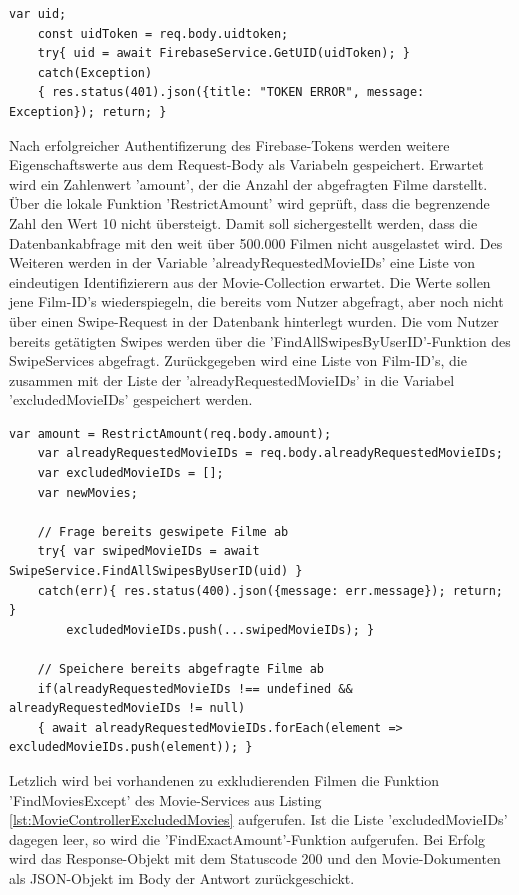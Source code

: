 \begin{lstlisting}[caption=Controller Firebase-Authentifizierung, label=lst:controllerfirebaseauth]
    var uid; 
    const uidToken = req.body.uidtoken;
    try{ uid = await FirebaseService.GetUID(uidToken); }
    catch(Exception)
    { res.status(401).json({title: "TOKEN ERROR", message: Exception}); return; }
\end{lstlisting}

\noindent
Nach erfolgreicher Authentifizerung des Firebase-Tokens werden weitere Eigenschaftswerte aus dem Request-Body als Variabeln gespeichert. Erwartet wird ein Zahlenwert 'amount', der die Anzahl der abgefragten Filme darstellt. Über die lokale Funktion 'RestrictAmount' wird geprüft, dass die begrenzende Zahl den Wert 10 nicht übersteigt. Damit soll sichergestellt werden, dass die Datenbankabfrage mit den weit über 500.000 Filmen nicht ausgelastet wird. Des Weiteren werden in der Variable 'alreadyRequestedMovieIDs' eine Liste von   eindeutigen Identifizierern aus der Movie-Collection erwartet. Die Werte sollen jene Film-ID's wiederspiegeln, die bereits vom Nutzer abgefragt, aber noch nicht über einen Swipe-Request in der Datenbank hinterlegt wurden. Die vom Nutzer bereits getätigten Swipes werden über die 'FindAllSwipesByUserID'-Funktion des SwipeServices abgefragt. Zurück\-gegeben wird eine Liste von Film-ID's, die zusammen mit der Liste der 'alreadyRequestedMovieIDs' in die Variabel 'excludedMovieIDs' gespeichert werden.\\

\begin{lstlisting}[caption=MovieController - RequestMovie - Excluded Movies, label=lst:MovieControllerExcludedMovies]
    var amount = RestrictAmount(req.body.amount);
    var alreadyRequestedMovieIDs = req.body.alreadyRequestedMovieIDs;
    var excludedMovieIDs = [];
    var newMovies;
    
    // Frage bereits geswipete Filme ab
    try{ var swipedMovieIDs = await SwipeService.FindAllSwipesByUserID(uid) }
    catch(err){ res.status(400).json({message: err.message}); return; }
        excludedMovieIDs.push(...swipedMovieIDs); }

    // Speichere bereits abgefragte Filme ab
    if(alreadyRequestedMovieIDs !== undefined && alreadyRequestedMovieIDs != null)
    { await alreadyRequestedMovieIDs.forEach(element => excludedMovieIDs.push(element)); }
\end{lstlisting}

\noindent
Letzlich wird bei vorhandenen zu exkludierenden Filmen die Funktion 'FindMoviesExcept' des Movie-Services aus Listing \ref{lst:MovieControllerExcludedMovies}  aufgerufen.  Ist die Liste 'excludedMovieIDs' dagegen leer, so wird die 'Find\-ExactAmount'-Funktion aufgerufen. Bei Erfolg wird das Response-Objekt mit dem Statuscode 200 und den Movie-Dokumenten als JSON-Objekt im Body der Antwort zurückgeschickt.\\

